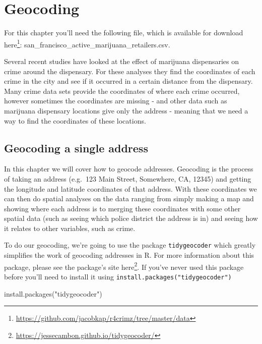\documentclass[
]{krantz}
\makeatletter
\newenvironment{Shaded}{\begin{snugshade}}{\end{snugshade}}
\newcommand{\FunctionTok}[1]{\textcolor[rgb]{0,0,0}{#1}}
\newcommand{\NormalTok}[1]{#1}
\newcommand{\StringTok}[1]{\textcolor[rgb]{0.5,0.5,0.5}{#1}}
\renewcommand{\href}[2]{#2\footnote{\url{#1}}}
\newenvironment{kframe}{%
\medskip{}
\setlength{\fboxsep}{.8em}
 \def\at@end@of@kframe{}%
 \ifinner\ifhmode%
  \def\at@end@of@kframe{\end{minipage}}%
  \begin{minipage}{\columnwidth}%
 \fi\fi%
 \def\FrameCommand##1{\hskip\@totalleftmargin \hskip-\fboxsep
 \colorbox{shadecolor}{##1}\hskip-\fboxsep
     \hskip-\linewidth \hskip-\@totalleftmargin \hskip\columnwidth}%
 \MakeFramed {\advance\hsize-\width
   \@totalleftmargin\z@ \linewidth\hsize
   \@setminipage}}%
 {\par\unskip\endMakeFramed%
 \at@end@of@kframe}
\renewenvironment{Shaded}{\begin{kframe}}{\end{kframe}}
\makeatother
\begin{document}
\hypertarget{geocoding}{%
\chapter{Geocoding}\label{geocoding}}

For this chapter you'll need the following file, which is
available for download
\href{https://github.com/jacobkap/r4crimz/tree/master/data}{here}:
san\_francisco\_active\_marijuana\_retailers.csv.

Several recent studies have looked at the effect of
marijuana dispensaries on crime around the dispensary. For
these analyses they find the coordinates of each crime in
the city and see if it occurred in a certain distance from
the dispensary. Many crime data sets provide the coordinates
of where each crime occurred, however sometimes the
coordinates are missing - and other data such as marijuana
dispensary locations give only the address - meaning that we
need a way to find the coordinates of these locations.

\hypertarget{geocoding-a-single-address}{%
\section{Geocoding a single
address}\label{geocoding-a-single-address}}

In this chapter we will cover how to geocode addresses.
Geocoding is the process of taking an address (e.g.~123 Main
Street, Somewhere, CA, 12345) and getting the longitude and
latitude coordinates of that address. With these coordinates
we can then do spatial analyses on the data ranging from
simply making a map and showing where each address is to
merging these coordinates with some other spatial data (such
as seeing which police district the address is in) and
seeing how it relates to other variables, such as crime.

To do our geocoding, we're going to use the package
\texttt{tidygeocoder} which greatly simplifies the work of
geocoding addresses in R. For more information about this
package, please see the package's site
\href{https://jessecambon.github.io/tidygeocoder/}{here}. If
you've never used this package before you'll need to install
it using \texttt{install.packages("tidygeocoder")}

\begin{Shaded}
\begin{Highlighting}[]
\FunctionTok{install.packages}\NormalTok{(}\StringTok{"tidygeocoder"}\NormalTok{)}
\end{Highlighting}
\end{Shaded}
\end{document}
